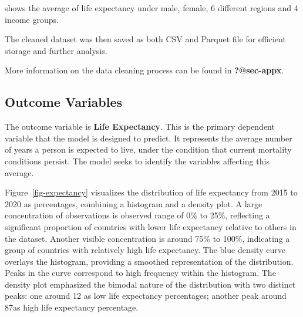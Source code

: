 \documentclass[
  letterpaper,
  DIV=11,
  numbers=noendperiod]{scrartcl}
\begin{document}
shows the average of life expectancy under male, female, 6 different
regions and 4 income groups.

The cleaned dataset was then saved as both CSV and Parquet file for
efficient storage and further analysis.

More information on the data cleaning process can be found in
\textbf{?@sec-appx}.

\subsection{Outcome Variables}\label{outcome-variables}

The outcome variable is \textbf{Life Expectancy}. This is the primary
dependent variable that the model is designed to predict. It represents
the average number of years a person is expected to live, under the
condition that current mortality conditions persist. The model seeks to
identify the variables affecting this average.

Figure~\ref{fig-expectancy} visualizes the distribution of life
expectancy from 2015 to 2020 as percentages, combining a histogram and a
density plot. A large concentration of observations is observed range of
0\% to 25\%, reflecting a significant proportion of countries with lower
life expectancy relative to others in the dataset. Another visible
concentration is around 75\% to 100\%, indicating a group of countries
with relatively high life expectancy. The blue density curve overlays
the histogram, providing a smoothed representation of the distribution.
Peaks in the curve correspond to high frequency within the histogram.
The density plot emphasized the bimodal nature of the distribution with
two distinct peaks: one around 12 as low life expectancy percentages;
another peak around 87as high life expectancy percentage.
\end{document}
